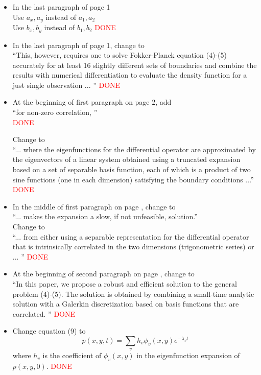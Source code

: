 \documentclass[12pt]{article}
\begin{document}
\begin{itemize}
\item In the last paragraph of page 1 \\
  Use $a_x, a_y$ instead of $a_1, a_2$ \\
  Use $b_x, b_y$ instead of $b_1, b_2$
  \textcolor{red}{DONE}

\item In the last paragraph of page 1, change to  \\
``This, however, requires one to solve Fokker-Planck equation (4)-(5) accurately for at least 16
slightly different sets of boundaries and combine the results with numerical differentiation 
to evaluate the density function for a just single observation ... ''   \textcolor{red}{DONE}

\item At the beginning of first paragraph on page 2, add \\
``for non-zero correlation, '' \\
\textcolor{red}{DONE}

Change to \\
``... where the eigenfunctions for the differential operator are approximated
by the eigenvectors of a linear system obtained using a truncated expansion based on 
a set of separable basis function, each of which is a product of two sine functions (one in each dimension) satisfying the boundary conditions ...'' \\
\textcolor{red}{DONE}

\item In the middle of first paragraph on page , change to \\
 ``... makes the expansion a slow, if not unfeasible, solution.'' \\
 Change to \\
 ``... from either using a separable representation for the differential operator that is intrinsically 
 correlated in the two dimensions (trigonometric series) or ... ''
 \textcolor{red}{DONE}

\item At the beginning of second paragraph on page , change to \\
``In this paper, we propose a robust and efficient solution to the general problem (4)-(5). The solution is obtained by combining a small-time analytic solution with a Galerkin discretization
based on basis functions that are correlated. ''
 \textcolor{red}{DONE}

\item Change equation (9) to 
$$p(x,y,t) = \sum_v h_v \phi_v (x, y) e^{-\lambda_v t} $$
where $h_v$ is the coefficient of $\phi_v (x, y) $ in the eigenfunction expansion of $p(x, y, 0)$.
 \textcolor{red}{DONE}


\end{itemize}
\end{document}
